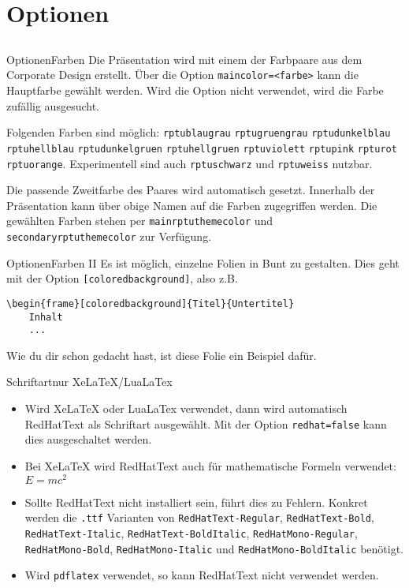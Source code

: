 \documentclass[german,10pt,xcolor=colortbl,compress
]{beamer}
\begin{document}
\section{Optionen}
\subsection*{}
\newcommand{\farbe}[1]{{\color{#1}\lstinline|#1|}}
\begin{frame}{Optionen}{Farben}
	Die Präsentation wird mit einem der Farbpaare aus dem Corporate Design erstellt. Über die Option \lstinline!maincolor=<farbe>! kann die Hauptfarbe gewählt werden. Wird die Option nicht verwendet, wird die Farbe zufällig ausgesucht. \par
	Folgenden Farben sind möglich:
	\farbe{rptublaugrau} \farbe{rptugruengrau} \farbe{rptudunkelblau} \farbe{rptuhellblau}
	\farbe{rptudunkelgruen} \farbe{rptuhellgruen} \farbe{rptuviolett} \farbe{rptupink}
	\farbe{rpturot} \farbe{rptuorange}. Experimentell sind auch \farbe{rptuschwarz} und \color{black}\lstinline!rptuweiss! nutzbar.\par
	Die passende Zweitfarbe des Paares wird automatisch gesetzt. Innerhalb der Präsentation kann über obige Namen auf die Farben zugegriffen werden. Die gewählten Farben stehen per \farbe{mainrptuthemecolor} und \farbe{secondaryrptuthemecolor} zur Verfügung. \par
\end{frame}
\begin{frame}{Optionen}{Farben II}
	Es ist möglich, einzelne Folien in Bunt zu gestalten. Dies geht mit der Option \lstinline![coloredbackground]!, also z.B.
	\begin{lstlisting}
\begin{frame}[coloredbackground]{Titel}{Untertitel}
	Inhalt
	...
\end{lstlisting}
	Wie du dir schon gedacht hast, ist diese Folie ein Beispiel dafür.
\end{frame}
\begin{frame}{Schriftart}{nur XeLaTeX/LuaLaTex}
	\begin{itemize}
		\item Wird XeLaTeX oder LuaLaTex verwendet, dann wird automatisch RedHatText als Schriftart ausgewählt. Mit der Option \lstinline!redhat=false! kann dies ausgeschaltet werden.
		\item Bei XeLaTeX wird RedHatText auch für mathematische Formeln verwendet: $E=mc^2$
		\item Sollte RedHatText nicht installiert sein, führt dies zu Fehlern. Konkret werden die \lstinline!.ttf! Varianten von \lstinline!RedHatText-Regular!, \lstinline!RedHatText-Bold!, \lstinline!RedHatText-Italic!, \lstinline!RedHatText-BoldItalic!, \lstinline!RedHatMono-Regular!, \lstinline!RedHatMono-Bold!, \lstinline!RedHatMono-Italic! und \lstinline!RedHatMono-BoldItalic! benötigt.
		\item Wird \lstinline!pdflatex! verwendet, so kann RedHatText nicht verwendet werden.
	\end{itemize}
\end{frame}
\end{document}
